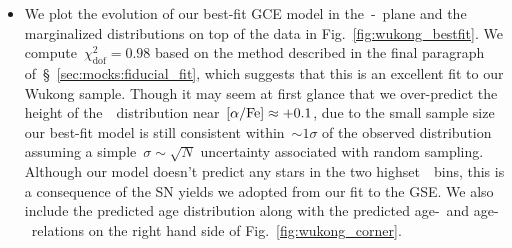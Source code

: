 \documentclass[ms.tex]{subfiles}
\begin{document}
\begin{itemize}
	\item We plot the evolution of our best-fit GCE model in the~\afe-\feh~plane
	and the marginalized distributions on top of the data in
	Fig.~\ref{fig:wukong_bestfit}.
	We compute~$\chi_\text{dof}^2 = 0.98$ based on the method described in the
	final paragraph of~\S~\ref{sec:mocks:fiducial_fit}, which suggests that
	this is an excellent fit to our Wukong sample.
	Though it may seem at first glance that we over-predict the height of
	the~\afe~distribution near~$\text{[$\alpha$/Fe]} \approx +0.1$, due to the small sample
	size our best-fit model is still consistent within~$\sim1\sigma$ of the
	observed distribution assuming a simple~$\sigma\sim\sqrt{N}$ uncertainty
	associated with random sampling.
	Although our model doesn't predict any stars in the two highset~\afe~bins,
	this is a consequence of the SN yields we adopted from our fit to the GSE.
	We also include the predicted age distribution along with the predicted
	age-\feh~and age-\afe~relations on the right hand side of
	Fig.~\ref{fig:wukong_corner}.

\end{itemize}
\end{document}
